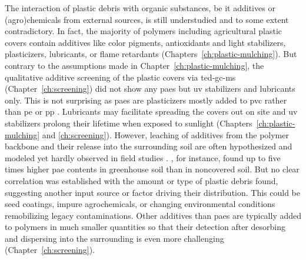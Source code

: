 The interaction of plastic debris with organic substances, be it additives or (agro)\-chemicals from external sources, is still understudied and to some extent contradictory.
In fact, the majority of polymers including agricultural plastic covers contain additives like color pigments, antioxidants and light stabilizers, plasticizers, lubricants, or flame retardants (Chapters~\ref{ch:plastic-mulching}). But contrary to the assumptions made in Chapter~\ref{ch:plastic-mulching}, the qualitative additive screening of the plastic covers via \ac{ted-gc-ms} (Chapter~\ref{ch:screening}) did not show any \acp{pae} but \ac{uv} stabilizers and lubricants only. This is not surprising as \acp{pae} are plasticizers mostly added to \ac{pvc} rather than \ac{pe} or \ac{pp} \citep{WaltersPlasticizers2020}. Lubricants may facilitate spreading the covers out on site and \ac{uv} stabilizers prolong their lifetime when exposed to sunlight (Chapters~\ref{ch:plastic-mulching} and \ref{ch:screening}).
However, leaching of additives from the polymer backbone and their release into the surrounding soil are often hypothesized \citep[Chapter~\ref{ch:plastic-mulching};][]{PathanSoil2020,ZhangTransport2020} and modeled \citep{ZhangAgricultural2021} yet hardly observed in field studies \citep{QiBehavior2020}.
, for instance, found up to five times higher \ac{pae} contents in greenhouse soil than in noncovered soil. But no clear correlation was established with the amount or type of plastic debris found, suggesting another input source or factor driving their distribution. This could be seed coatings, impure agrochemicals, or changing environmental conditions remobilizing legacy contaminations.
Other additives than \acp{pae} are typically added to polymers in much smaller quantities \citep{HahladakisOverview2018} so that their detection after desorbing and dispersing into the surrounding is even more challenging (Chapter~\ref{ch:screening}).


